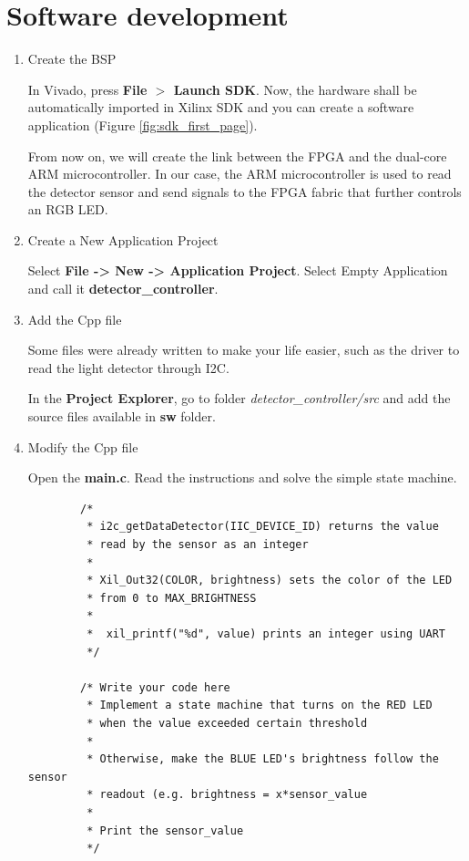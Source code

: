 \documentclass{article}
\begin{document}
\section{Software development}

\begin{enumerate}
\item Create the BSP

In Vivado, press \textbf{File $>$ Launch SDK}. Now, the hardware shall be automatically imported in Xilinx SDK and you can create a software application (Figure \ref{fig:sdk_first_page}).

From now on, we will create the link between the FPGA and the dual-core ARM microcontroller. In our case, the ARM microcontroller is used to read the detector sensor and send signals to the FPGA fabric that further controls an RGB LED.

\item Create a New Application Project

Select \textbf{File -> New -> Application Project}. Select Empty Application and call it \textbf{detector\_controller}.


\item  Add the Cpp file

Some files were already written to make your life easier, such as the driver to read the light detector through I2C. 

In the \textbf{Project Explorer}, go to folder \textit{detector\_controller/src} and add the source files available in \textbf{sw} folder.


\item  Modify the Cpp file

Open the \textbf{main.c}. Read the instructions and solve the simple state machine.

\begin{verbatim}
        /*
         * i2c_getDataDetector(IIC_DEVICE_ID) returns the value
         * read by the sensor as an integer
         *
         * Xil_Out32(COLOR, brightness) sets the color of the LED
         * from 0 to MAX_BRIGHTNESS
         *
         *  xil_printf("%d", value) prints an integer using UART
         */

        /* Write your code here
         * Implement a state machine that turns on the RED LED
         * when the value exceeded certain threshold
         *
         * Otherwise, make the BLUE LED's brightness follow the sensor
         * readout (e.g. brightness = x*sensor_value
         *
         * Print the sensor_value
         */
\end{verbatim}




\end{enumerate}
\end{document}
